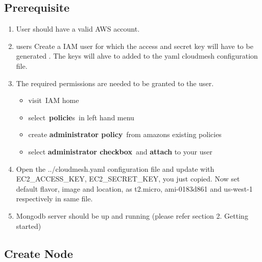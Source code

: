 \documentclass[9pt,twocolumn,twoside]{../../styles/osajnl}
\begin{document}
\subsection{Prerequisite}

\begin{enumerate}

\item User should have a valid AWS account.\item
  users Create a IAM
  \cite{www-aws-iam} user for which the access and secret key will
  have to be generated \cite{www-attach-policy}. The keys will ahve to
  added to the yaml cloudmesh configuration file.
	
\item The required permissions are needed to be granted to the user.
  
  \begin{itemize}			
  \item visit IAM home \cite{www-aws-iam-home}
  \item select \textbf{policie}s in left hand menu
  \item create \textbf{administrator policy} from amazons existing
    policies
  \item select \textbf{administrator checkbox} and \textbf{attach} to
    your user
  \end{itemize}
		
\item Open the ../cloudmesh.yaml configuration file and update with
  EC2\_ACCESS\_KEY, EC2\_SECRET\_KEY, you just copied. Now set default
  flavor, image and location, as t2.micro, ami-0183d861 and us-west-1
  respectively in same file.

\item Mongodb server should be up and running (please refer section
  2. Getting started)


\end{enumerate}

\subsection{Create Node}
\end{document}
